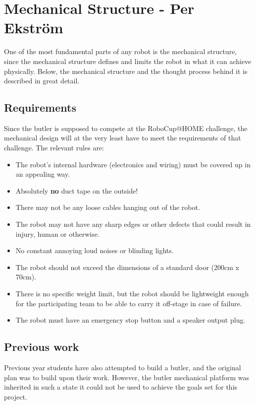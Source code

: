 \section{Mechanical Structure - Per Ekstr\"om}

One of the most fundamental parts of any robot is the mechanical structure, since the mechanical structure defines and limits the robot in what it can achieve physically. Below, the mechanical structure and the thought process behind it is described in great detail.

\subsection{Requirements}

Since the butler is supposed to compete at the RoboCup@HOME challenge\cite{robocup-rulebook}, the mechanical design will at the very least have to meet the requirements of that challenge. The relevant rules are:

\begin{itemize}
    \item The robot's internal hardware (electronics and wiring) must be covered up in an appealing way.
    \item Absolutely \textbf{no} duct tape on the outside!
    \item There may not be any loose cables hanging out of the robot.
    \item The robot may not have any sharp edges or other defects that could result in injury, human or otherwise.
    \item No constant annoying loud noises or blinding lights.
    \item The robot should not exceed the dimensions of a standard door (200cm x 70cm).
    \item There is no specific weight limit, but the robot should be lightweight enough for the participating team to be able to carry it off-stage in case of failure.
    \item The robot must have an emergency stop button and a speaker output plug.
\end{itemize}


\subsection{Previous work}

Previous year students have also attempted to build a butler, and the original plan was to build upon their work. However, the butler mechanical platform was inherited in such a state it could not be used to achieve the goals set for this project.

